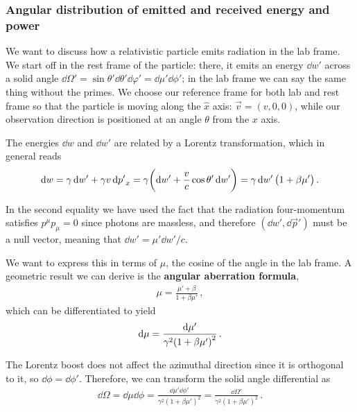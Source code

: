 \documentclass[main.tex]{subfiles}
\begin{document}
\subsubsection{Angular distribution of emitted and received energy and power}


We want to discuss how a relativistic particle emits radiation in the lab frame. 
We start off in the rest frame of the particle: there, it emits an energy \(\dd{w}'\) across a solid angle \(\dd{\Omega '} = \sin \theta ' \dd{\theta '} \dd{\varphi '} = \dd{\mu '} \dd{\phi '}\); in the lab frame we can say the same thing without the primes. 
We choose our reference frame for both lab and rest frame so that the particle is moving along the \(\hat{x}\) axis: \(\vec{v} = (v, 0, 0)\), while our observation direction is positioned at an angle \(\theta \) from the \(x\) axis. 

The energies \(\dd{w}\) and \(\dd{w}'\) are related by a Lorentz transformation, which in general reads 
%
\begin{align}
\dd{w} = \gamma \dd{w'} + \gamma v \dd{p'}_x
= \gamma \qty( \dd{w'} + \frac{v}{c} \cos \theta ' \dd{w'})
= \gamma \dd{w'} \qty(1 + \beta \mu')
\,.
\end{align}

In the second equality we have used the fact that the radiation four-momentum satisfies \(p^{\mu } p_{\mu } = 0\) since photons are massless, and therefore \((\dd{w'}, \dd{\vec{p}}')\) must be a null vector, meaning that \(\dd{w'} = \mu ' \dd{w'}/ c\).

We want to express this in terms of \(\mu \), the cosine of the angle in the lab frame. A geometric result we can derive is the \textbf{angular aberration formula}, 
%
\begin{align}
\mu = \frac{\mu ' + \beta }{1 + \beta \mu '}
\,,
\end{align}
%
which can be differentiated to yield 
%
\begin{align}
\dd{\mu } = \frac{ \dd{\mu '}}{\gamma^2 \qty(1 + \beta \mu ')^2}
\,.
\end{align}

The Lorentz boost does not affect the azimuthal direction since it is orthogonal to it, so \(\dd{\phi } = \dd{\phi '}\).
Therefore, we can transform the solid angle differential as 
%
\begin{align}
\dd{\Omega } = \dd{\mu } \dd{\phi } = \frac{ \dd{\mu '} \dd{\phi }' }{\gamma^2 ( 1 + \beta \mu ')^2} = \frac{ \dd{\Omega '}}{\gamma^2 ( 1 + \beta \mu ')^2}
\,.
\end{align}
\end{document}
